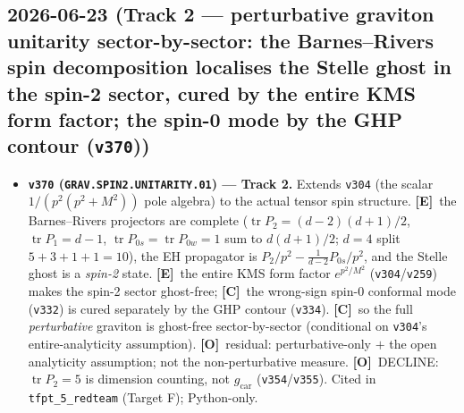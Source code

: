 \documentclass[11pt]{article}
\providecommand{\mE}{\textbf{[E]}}\providecommand{\mC}{\textbf{[C]}}
\providecommand{\mO}{\textbf{[O]}}\providecommand{\mX}{\textbf{[X]}}
\providecommand{\vref}[1]{\texttt{#1}}
\providecommand{\gcar}{g_{\mathrm{car}}}\providecommand{\Nfam}{N_{\mathrm{fam}}}
\begin{document}
\subsection*{2026-06-23 (Track 2 --- perturbative graviton unitarity sector-by-sector: the Barnes--Rivers spin decomposition localises the Stelle ghost in the spin-2 sector, cured by the entire KMS form factor; the spin-0 mode by the GHP contour (\texttt{v370}))}
\begin{itemize}
\item \textbf{\texttt{v370} (\texttt{GRAV.SPIN2.UNITARITY.01}) --- Track 2.} Extends \vref{v304} (the scalar
$1/(p^2(p^2{+}M^2))$ pole algebra) to the actual tensor spin structure. \mE\ the Barnes--Rivers projectors are
complete ($\operatorname{tr}P_2{=}(d{-}2)(d{+}1)/2$, $\operatorname{tr}P_1{=}d{-}1$,
$\operatorname{tr}P_{0s}{=}\operatorname{tr}P_{0w}{=}1$ sum to $d(d{+}1)/2$; $d{=}4$ split $5{+}3{+}1{+}1{=}10$),
the EH propagator is $P_2/p^2-\tfrac1{d-2}P_{0s}/p^2$, and the Stelle ghost is a \emph{spin-2} state. \mE\ the
entire KMS form factor $e^{p^2/M^2}$ (\vref{v304}/\vref{v259}) makes the spin-2 sector ghost-free; \mC\ the
wrong-sign spin-0 conformal mode (\vref{v332}) is cured separately by the GHP contour (\vref{v334}). \mC\ so the
full \emph{perturbative} graviton is ghost-free sector-by-sector (conditional on \vref{v304}'s entire-analyticity
assumption). \mO\ residual: perturbative-only $+$ the open analyticity assumption; not the non-perturbative
measure. \mO\ DECLINE: $\operatorname{tr}P_2{=}5$ is dimension counting, not $\gcar$ (\vref{v354}/\vref{v355}).
Cited in \texttt{tfpt\_5\_redteam} (Target F); Python-only.
\end{itemize}
\end{document}
